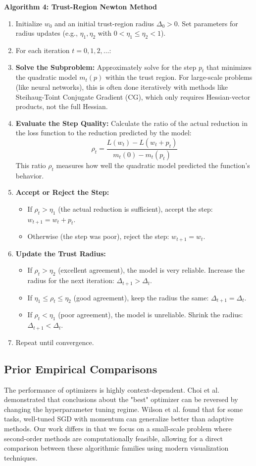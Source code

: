 \documentclass[20pt]{article}
\begin{document}
\textbf{Algorithm 4: Trust-Region Newton Method}
\begin{enumerate}
    \item Initialize $w_0$ and an initial trust-region radius $\Delta_0 > 0$. Set parameters for radius updates (e.g., $\eta_1, \eta_2$ with $0 < \eta_1 \le \eta_2 < 1$).
    \item For each iteration $t = 0, 1, 2, \dots$:
    \item \quad \textbf{Solve the Subproblem:} Approximately solve for the step $p_t$ that minimizes the quadratic model $m_t(p)$ within the trust region. For large-scale problems (like neural networks), this is often done iteratively with methods like Steihaug-Toint Conjugate Gradient (CG), which only requires Hessian-vector products, not the full Hessian.
    \item \quad \textbf{Evaluate the Step Quality:} Calculate the ratio of the actual reduction in the loss function to the reduction predicted by the model:
    \[ \rho_t = \frac{L(w_t) - L(w_t + p_t)}{m_t(0) - m_t(p_t)} \]
    This ratio $\rho_t$ measures how well the quadratic model predicted the function's behavior.
    \item \quad \textbf{Accept or Reject the Step:}
    \begin{itemize}
        \item If $\rho_t > \eta_1$ (the actual reduction is sufficient), accept the step: $w_{t+1} = w_t + p_t$.
        \item Otherwise (the step was poor), reject the step: $w_{t+1} = w_t$.
    \end{itemize}
    \item \quad \textbf{Update the Trust Radius:}
    \begin{itemize}
        \item If $\rho_t > \eta_2$ (excellent agreement), the model is very reliable. Increase the radius for the next iteration: $\Delta_{t+1} > \Delta_t$.
        \item If $\eta_1 \le \rho_t \le \eta_2$ (good agreement), keep the radius the same: $\Delta_{t+1} = \Delta_t$.
        \item If $\rho_t < \eta_1$ (poor agreement), the model is unreliable. Shrink the radius: $\Delta_{t+1} < \Delta_t$.
    \end{itemize}
    \item Repeat until convergence.
\end{enumerate}

\subsection{Prior Empirical Comparisons}
The performance of optimizers is highly context-dependent. Choi et al. \cite{Choi2019comparisons} demonstrated that conclusions about the "best" optimizer can be reversed by changing the hyperparameter tuning regime. Wilson et al. \cite{Wilson2017marginal} found that for some tasks, well-tuned SGD with momentum can generalize better than adaptive methods. Our work differs in that we focus on a small-scale problem where second-order methods are computationally feasible, allowing for a direct comparison between these algorithmic families using modern visualization techniques.
\end{document}
